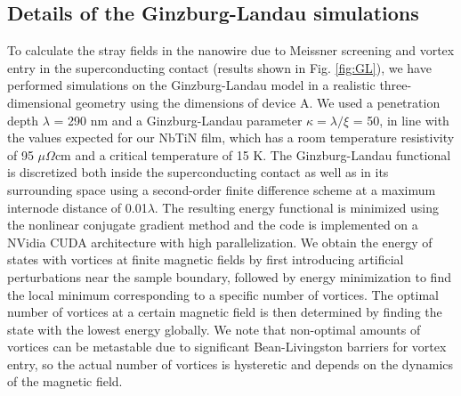 \documentclass[prl,singlecolumn,notitlepage,secnumroman,superscriptaddress,nobibnotes,graphicx,amsmath,amssymb]{revtex4-2}
\begin{document}
\subsection{Details of the Ginzburg-Landau simulations}
To calculate the stray fields in the nanowire due to Meissner screening and vortex entry in the superconducting contact (results shown in Fig. \ref{fig:GL}), we have performed simulations on the Ginzburg-Landau model \cite{Gropp1996} in a realistic three-dimensional geometry using the dimensions of device A. We used a penetration depth $\lambda$ = 290 nm and a Ginzburg-Landau parameter $\kappa = \lambda / \xi$ = 50, in line with the values expected for our NbTiN film, which has a room temperature resistivity of 95 $\mu \Omega$cm and a critical temperature of 15 K. The Ginzburg-Landau functional is discretized both inside the superconducting contact as well as in its surrounding space \cite{Du1999} using a second-order finite difference scheme at a maximum internode distance of 0.01$\lambda$. The resulting energy functional is minimized using the nonlinear conjugate gradient method and the code is implemented on a NVidia CUDA architecture with high parallelization.
We obtain the energy of states with vortices at finite magnetic fields by first introducing artificial perturbations near the sample boundary, followed by energy minimization to find the local minimum corresponding to a specific number of vortices. The optimal number of vortices at a certain magnetic field is then determined by finding the state with the lowest energy globally. We note that non-optimal amounts of vortices can be metastable due to significant Bean-Livingston barriers for vortex entry, so the actual number of vortices is hysteretic and depends on the dynamics of the magnetic field.
\end{document}
